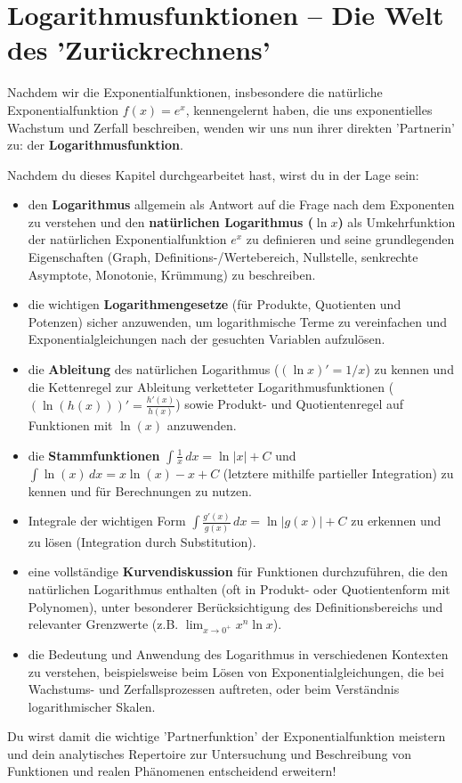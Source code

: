 \section{Logarithmusfunktionen – Die Welt des 'Zurückrechnens'}
\label{sec:logarithmusfunktionen_intro}

Nachdem wir die Exponentialfunktionen, insbesondere die natürliche Exponentialfunktion $f(x)=e^x$, kennengelernt haben, die uns exponentielles Wachstum und Zerfall beschreiben, wenden wir uns nun ihrer direkten 'Partnerin' zu: der \textbf{Logarithmusfunktion}.

\begin{tcolorbox}[colback=blue!5!white, colframe=blue!75!black, title=Was du in diesem Kapitel lernen wirst:]
Nachdem du dieses Kapitel durchgearbeitet hast, wirst du in der Lage sein:
\begin{itemize}[noitemsep, topsep=0pt, leftmargin=*, itemsep=2pt]
    \item den \textbf{Logarithmus} allgemein als Antwort auf die Frage nach dem Exponenten zu verstehen und den \textbf{natürlichen Logarithmus ($\ln x$)} als Umkehrfunktion der natürlichen Exponentialfunktion $e^x$ zu definieren und seine grundlegenden Eigenschaften (Graph, Definitions-/Wertebereich, Nullstelle, senkrechte Asymptote, Monotonie, Krümmung) zu beschreiben.
    \item die wichtigen \textbf{Logarithmengesetze} (für Produkte, Quotienten und Potenzen) sicher anzuwenden, um logarithmische Terme zu vereinfachen und Exponentialgleichungen nach der gesuchten Variablen aufzulösen.
    \item die \textbf{Ableitung} des natürlichen Logarithmus ($(\ln x)' = 1/x$) zu kennen und die Kettenregel zur Ableitung verketteter Logarithmusfunktionen ($(\ln(h(x)))' = \frac{h'(x)}{h(x)}$) sowie Produkt- und Quotientenregel auf Funktionen mit $\ln(x)$ anzuwenden.
    \item die \textbf{Stammfunktionen} $\int \frac{1}{x} \,dx = \ln|x|+C$ und $\int \ln(x) \,dx = x\ln(x) - x + C$ (letztere mithilfe partieller Integration) zu kennen und für Berechnungen zu nutzen.
    \item Integrale der wichtigen Form $\int \frac{g'(x)}{g(x)} \,dx = \ln|g(x)|+C$ zu erkennen und zu lösen (Integration durch Substitution).
    \item eine vollständige \textbf{Kurvendiskussion} für Funktionen durchzuführen, die den natürlichen Logarithmus enthalten (oft in Produkt- oder Quotientenform mit Polynomen), unter besonderer Berücksichtigung des Definitionsbereichs und relevanter Grenzwerte (z.B. $\lim_{x \to 0^+} x^n \ln x$).
    \item die Bedeutung und Anwendung des Logarithmus in verschiedenen Kontexten zu verstehen, beispielsweise beim Lösen von Exponentialgleichungen, die bei Wachstums- und Zerfallsprozessen auftreten, oder beim Verständnis logarithmischer Skalen.
\end{itemize}
Du wirst damit die wichtige 'Partnerfunktion' der Exponentialfunktion meistern und dein analytisches Repertoire zur Untersuchung und Beschreibung von Funktionen und realen Phänomenen entscheidend erweitern!
\end{tcolorbox}
\bigskip

